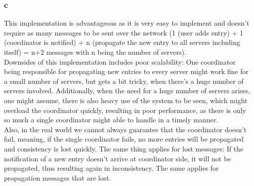 \documentclass[a4paper, 12pt]{article}
\begin{document}
\subsubsection*{c}
This implementation is advantageous as it is very easy to implement and doesn't require 
as many messages to be sent over the network (1 (user adds entry) + 1 (coordinator is notified) + n (propagate the new entry to all servers including itself) = n+2 messages with n being the number of servers).\\
Downsides of this implementation includes poor scalability: One coordinator being responsible 
for propagating new entries to every server might work fine for a small number of servers, 
but gets a bit tricky, when there's a huge number of servers involved. Additionally, 
when the need for a huge number of servers arises, one might assume, there is also 
heavy use of the system to be seen, which might overload the coordinator quickly, 
resulting in poor performance, as there is only so much a single coordinator might 
able to handle in a timely manner.\\
Also, in the real world we cannot always guarantee that the coordinator doesn't fail, 
meaning, if the single coordinator fails, no more entries will be propagated and 
consistency is lost quickly. The same thing applies for lost messages: If the notification 
of a new entry doesn't arrive at coordinator side, it will not be propagated, thus 
resulting again in inconsistency. The same applies for propagation messages that 
are lost.
\end{document}
